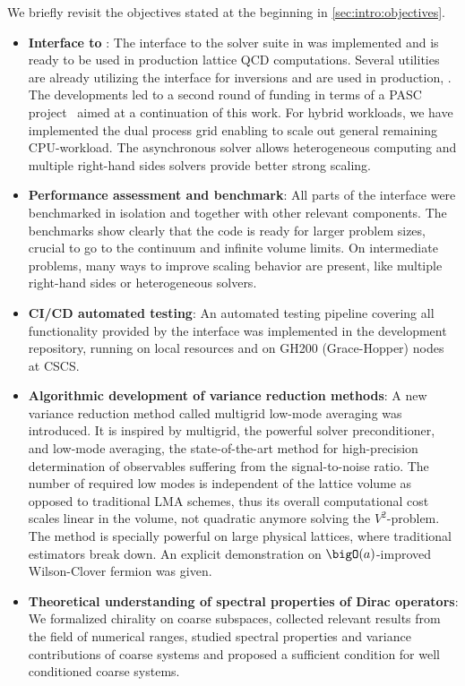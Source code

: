 We briefly revisit the objectives stated at the beginning in \cref{sec:intro:objectives}.
\begin{itemize}
   \item \textbf{Interface to \quda}: The interface to the solver suite in \quda was implemented and is ready to be used in production lattice QCD computations. Several utilities are already utilizing the interface for inversions and are used in production, . The developments led to a second round of funding in terms of a PASC project~\cite{online:pasc2025} aimed at a continuation of this work. For hybrid workloads, we have implemented the dual process grid enabling to scale out general remaining CPU-workload. The asynchronous solver allows heterogeneous computing and multiple right-hand sides solvers provide better strong scaling.
   \item \textbf{Performance assessment and benchmark}: All parts of the interface were benchmarked in isolation and together with other relevant components. The benchmarks show clearly that the code is ready for larger problem sizes, crucial to go to the continuum and infinite volume limits. On intermediate problems, many ways to improve scaling behavior are present, like multiple right-hand sides or heterogeneous solvers.
   \item \textbf{CI/CD automated testing}: An automated testing pipeline covering all functionality provided by the interface was implemented in the development repository, running on local resources and on GH200 (Grace-Hopper) nodes at CSCS.
   \item \textbf{Algorithmic development of variance reduction methods}: A new variance reduction method called multigrid low-mode averaging was introduced. It is inspired by multigrid, the powerful solver preconditioner, and low-mode averaging, the state-of-the-art method for high-precision determination of observables suffering from the signal-to-noise ratio. The number of required low modes is independent of the lattice volume as opposed to traditional LMA schemes, thus its overall computational cost scales linear in the volume, not quadratic anymore solving the $V^{2}$-problem. The method is specially powerful on large physical lattices, where traditional estimators break down. An explicit demonstration on $\bigO(a)$-improved Wilson-Clover fermion was given.
   \item \textbf{Theoretical understanding of spectral properties of Dirac operators}: We formalized chirality on coarse subspaces, collected relevant results from the field of numerical ranges, studied spectral properties and variance contributions of coarse systems and proposed a sufficient condition for well conditioned coarse systems.
\end{itemize}

